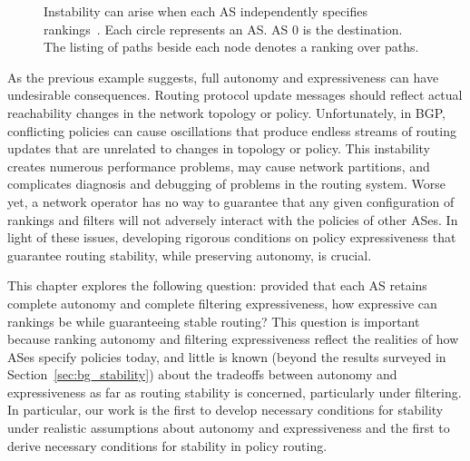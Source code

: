\begin{figure}
\centerline{}
\caption[Safety violation caused by conflicting rankings in different
  ASes]{Instability can arise when each AS independently specifies 
  rankings~\protect\cite{Griffin2002c,Varadhan1996}. Each circle
  represents an AS.  AS $0$ is the destination.  The listing of paths
  beside each node denotes a ranking over paths.}
\label{fig:bg1}
\end{figure}

As the previous example suggests, full autonomy and expressiveness can
have undesirable consequences.  Routing protocol update messages
should reflect actual reachability changes in the network topology or
policy.  Unfortunately, in BGP, conflicting policies can cause
oscillations that produce endless streams of routing updates that are
unrelated to changes in topology or policy.  This instability creates
numerous performance problems, may cause network partitions, and
complicates diagnosis and debugging of problems in the routing
system.
Worse yet, a network operator has no way to guarantee that any given
configuration of rankings and filters will not adversely interact with
the policies of other ASes.  In light of these issues, developing
rigorous conditions on policy expressiveness that guarantee routing
stability, while preserving autonomy, is crucial.

This chapter explores the following question: provided that each AS
retains complete autonomy and complete filtering expressiveness, how
expressive can rankings be while guaranteeing stable routing?  This
question is important because ranking autonomy and filtering
expressiveness reflect the realities of how ASes specify policies today,
and little is known (beyond the results surveyed in
Section~\ref{sec:bg_stability}) about the tradeoffs between autonomy and
expressiveness as far as routing stability is concerned, particularly
under filtering.  In particular, our work is the first to develop
necessary conditions for stability under realistic assumptions about
autonomy and expressiveness and the first to derive necessary conditions
for stability in policy routing.



